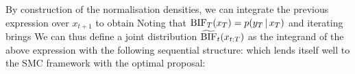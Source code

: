 %
By construction of the normalisation densities, we can integrate the previous expression over $x_{t+1}$ to obtain
%
%
Noting that $\text{BIF}_{T}(x_{T})=p(y_{T}\,|\, x_{T})$ and iterating brings
%
%
We can thus define a joint distribution $\widetilde{\text{BIF}}_{t}(x_{t:T})$ as the integrand of the above expression with the following sequential structure:
which lends itself well to the SMC framework with the optimal proposal:
%
%
